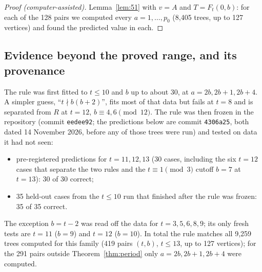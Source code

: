 \documentclass[11pt]{amsart}
\theoremstyle{definition}
\begin{document}
\begin{proof}[Proof (computer-assisted)]
Lemma~\ref{lem:51} with $v=A$ and $T=F_t(0,b)$: for each of the 128 pairs we computed every $a=1,\dots,p_0$
(8{,}405 trees, up to 127 vertices) and found the predicted value in each.
\end{proof}

\subsection*{Evidence beyond the proved range, and its provenance}
The rule was first fitted to $t\le 10$ and $b$ up to about 30, at $a=2b,2b+1,2b+4$. A simpler guess,
``$t\nmid b(b+2)$'', fits most of that data but fails at $t=8$ and is separated from $R$ at $t=12$,
$b\equiv 4,6\pmod{12}$. The rule was then frozen in the repository (commit \texttt{eedee92}; the predictions below are commit
\texttt{4306a25}, both dated 14 November 2026, before any of those trees were run) and tested on data it had not
seen:
\begin{itemize}
\item pre-registered predictions for $t=11,12,13$ (30 cases, including the six $t=12$ cases that separate the two
  rules and the $t\equiv 1\pmod 3$ cutoff $b=7$ at $t=13$): 30 of 30 correct;
\item 35 held-out cases from the $t\le 10$ run that finished after the rule was frozen: 35 of 35 correct.
\end{itemize}
The exception $b=t-2$ was read off the data for $t=3,5,6,8,9$; its only fresh tests are $t=11$ ($b=9$) and $t=12$
($b=10$). In total the rule matches all 9{,}259 trees computed for this family (419 pairs $(t,b)$, $t\le 13$, up
to 127 vertices); for the 291 pairs outside Theorem~\ref{thm:period} only $a=2b,2b+1,2b+4$ were computed.
\end{document}
